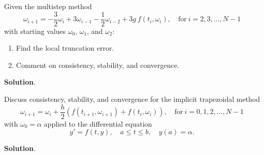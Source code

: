 \documentclass[11pt]{article}
\theoremstyle{break}
\numberwithin{equation}{theorem}
\begin{document}
\newpage
\begin{problem}\label{problem 17} %
    Given the multistep method $$\omega_{i+1}=-\dfrac{3}{2}\omega_i+3\omega_{i-1}-\dfrac{1}{2}\omega_{i-2}+3g\:f(t_i, \omega_i), \quad \text{for}\ i=2,3,\dots, N-1$$ with starting values $\omega_0$, $\omega_1$, and $\omega_2$:
    \begin{enumerate}
        \item Find the local truncation error.
        \item Comment on consistency, stability, and convergence.
    \end{enumerate}
\end{problem}
\textbf{Solution}.


\newpage
\begin{problem}\label{problem 18} %
    Discuss consistency, stability, and convergence for the implicit trapezoidal method $$\omega_{i+1}=\omega_i+\dfrac{h}{2}\left(f(t_{i+1}, \omega_{i+1})+f(t_i, \omega_i)\right),\quad \text{for}\ i=0,1,2,\dots, N-1$$ with $\omega_0=\alpha$ applied to the differential equation $$y'=f(t, y), \quad a\leq t\leq b, \quad y(a)=\alpha.$$
\end{problem}
\textbf{Solution}.
\end{document}
